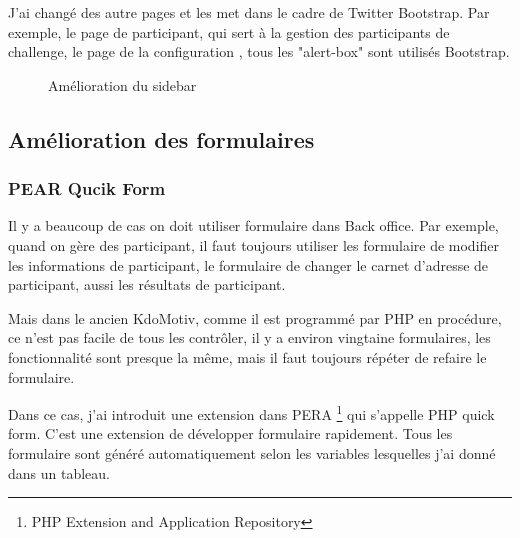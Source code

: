 J'ai changé des autre pages et les met dans le cadre de Twitter Bootstrap. Par exemple, le page de participant, qui sert à la gestion des participants de challenge, le page de la configuration , tous les "alert-box" sont utilisés Bootstrap.
\begin{figure}
  \centering
  \caption{Amélioration du sidebar}
\end{figure}



\subsection{Amélioration des formulaires}

\subsubsection{PEAR Qucik Form}
Il y a beaucoup de cas on doit utiliser formulaire dans Back office.
Par exemple, quand on gère  des participant, il faut toujours utiliser les formulaire de modifier les informations de participant, le formulaire de changer le carnet d'adresse de participant, aussi les résultats de participant. 

Mais dans le ancien KdoMotiv, comme il est programmé par PHP en procédure, ce n'est pas facile de tous les contrôler, il y a environ vingtaine formulaires, les fonctionnalité sont presque la même, mais il faut toujours répéter de refaire le formulaire.

Dans ce cas, j'ai introduit une extension dans PERA \footnote{PHP Extension and Application Repository} qui s'appelle PHP quick form. C'est une extension de développer formulaire rapidement. Tous les formulaire sont généré automatiquement selon les variables lesquelles j'ai donné dans un tableau. 

